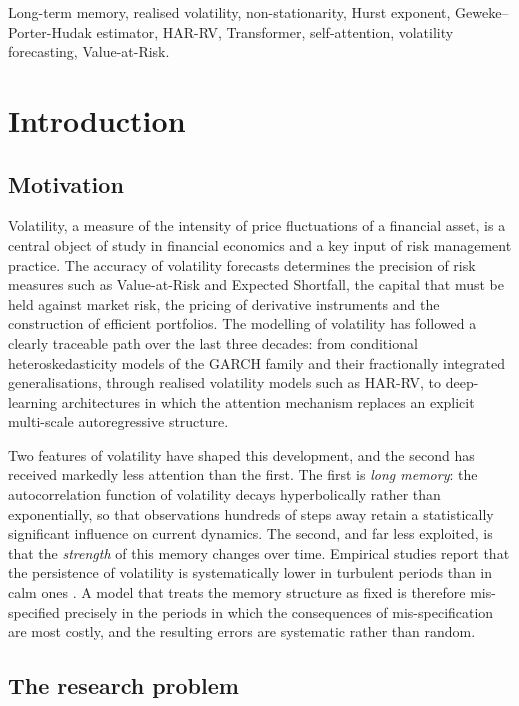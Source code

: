 \documentclass[journal]{IEEEtran}
\begin{document}
\begin{IEEEkeywords}
Long-term memory, realised volatility, non-stationarity, Hurst exponent, Geweke--Porter-Hudak
estimator, HAR-RV, Transformer, self-attention, volatility forecasting, Value-at-Risk.
\end{IEEEkeywords}

\section{Introduction}
\label{sec:intro}

\subsection{Motivation}

Volatility, a measure of the intensity of price fluctuations of a financial asset, is a central
object of study in financial economics and a key input of risk management practice. The accuracy of
volatility forecasts determines the precision of risk measures such as Value-at-Risk and Expected
Shortfall, the capital that must be held against market risk, the pricing of derivative
instruments and the construction of efficient portfolios. The modelling of volatility has followed a
clearly traceable path over the last three decades: from conditional heteroskedasticity models of
the GARCH family and their fractionally integrated generalisations, through realised volatility
models such as HAR-RV, to deep-learning architectures in which the attention mechanism replaces an
explicit multi-scale autoregressive structure.

Two features of volatility have shaped this development, and the second has received markedly less
attention than the first. The first is \emph{long memory}: the autocorrelation function of
volatility decays hyperbolically rather than exponentially, so that observations hundreds of steps
away retain a statistically significant influence on current dynamics. The second, and far less
exploited, is that the \emph{strength} of this memory changes over time. Empirical studies report
that the persistence of volatility is systematically lower in turbulent periods than in calm ones
\cite{ding1993long,andersen2003modeling,vogl2023hurst}. A model that treats the memory structure
as fixed is therefore mis-specified precisely in the periods in which the consequences of
mis-specification are most costly, and the resulting errors are systematic rather than random.

\subsection{The research problem}
\end{document}
